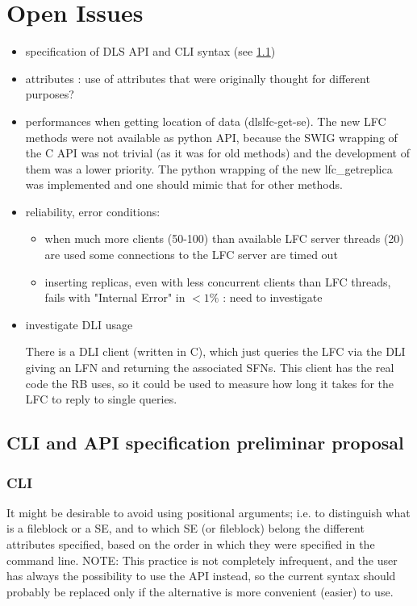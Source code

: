 \documentclass[pdftex]{cmspaper}
\begin{document}
\section{Open Issues}
\begin{itemize}
 \item specification of DLS API and CLI syntax (see \ref{appendix})
 \item attributes : use of attributes that were originally thought for different purposes?
 \item performances when getting location of data (dlslfc-get-se). 
The new LFC methods were not available as python API, because the SWIG wrapping of the C API was not trivial (as it was for old methods) and the development of them was a lower priority. The python wrapping of the new lfc\_getreplica was implemented and one should mimic that for other methods.
 
 \item reliability, error conditions: 
       \begin{itemize}
       \item when much more clients (50-100) than available LFC server threads (20) are used some connections 
       to the LFC server are timed out
       \item inserting replicas, even with less concurrent clients than LFC threads, fails with "Internal Error" in $<1\%$ : need to investigate
      \end{itemize}
 \item investigate DLI usage

 There is a DLI client (written in C), which just queries the LFC via
 the DLI giving an LFN and returning the associated SFNs. This client has
 the real code the RB uses, so it could be used to measure how long it
 takes for the LFC to reply to single queries.

\end{itemize}  


\subsection{CLI and API specification preliminar proposal}
\label{appendix}

\subsubsection{CLI}

It might be desirable to avoid using positional arguments; i.e. to distinguish
what is a fileblock or a SE, and to which SE (or fileblock) belong the different
attributes specified, based on the order in which they were specified in the
command line.
                                                                                                                      NOTE: This practice is not completely infrequent, and the user has always the
possibility to use the API instead, so the current syntax should probably be
replaced only if the alternative is more convenient (easier) to use.
\end{document}
